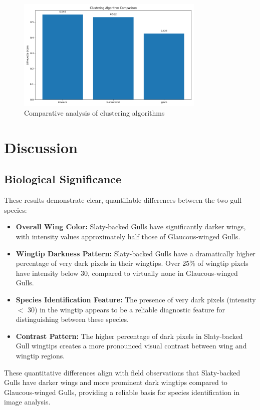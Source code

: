 \documentclass[a4paper,12pt]{report}
\begin{document}
\begin{figure}[H]
    \centering
    \includegraphics[width=0.8\textwidth]{images/clustering/algorithm_comparison.png}
    \caption{Comparative analysis of clustering algorithms}
    \label{fig:algorithm_comparison}
\end{figure}

\chapter{Discussion}

\section{Biological Significance}

These results demonstrate clear, quantifiable differences between the two gull species:

\begin{itemize}
    \item \textbf{Overall Wing Color:} Slaty-backed Gulls have significantly darker wings, with intensity values approximately half those of Glaucous-winged Gulls.
    
    \item \textbf{Wingtip Darkness Pattern:} Slaty-backed Gulls have a dramatically higher percentage of very dark pixels in their wingtips. Over 25\% of wingtip pixels have intensity below 30, compared to virtually none in Glaucous-winged Gulls.
    
    \item \textbf{Species Identification Feature:} The presence of very dark pixels (intensity $<$ 30) in the wingtip appears to be a reliable diagnostic feature for distinguishing between these species.
    
    \item \textbf{Contrast Pattern:} The higher percentage of dark pixels in Slaty-backed Gull wingtips creates a more pronounced visual contrast between wing and wingtip regions.
\end{itemize}

These quantitative differences align with field observations that Slaty-backed Gulls have darker wings and more prominent dark wingtips compared to Glaucous-winged Gulls, providing a reliable basis for species identification in image analysis.




\end{document}
